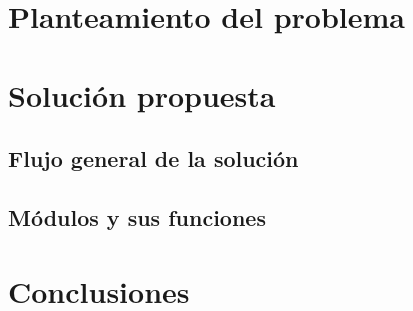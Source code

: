 \documentclass{report}
\begin{document}

    \tableofcontents

    \chapter{\LARGE{Planteamiento del problema}}
    


    \chapter{\LARGE{Solución propuesta}}

    \section{\Large{Flujo general de la solución}}
    


    \section{\Large{Módulos y sus funciones}}
    
    

    \chapter{\LARGE{Conclusiones}}
    

    \newpage  
    \printbibliography
\end{document}
